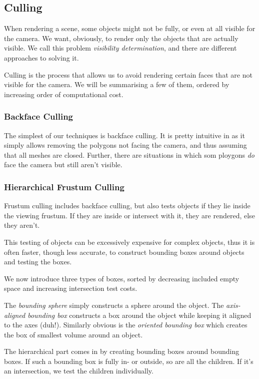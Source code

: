 \documentclass{panikzettel}
\begin{document}
\subsection{Culling}

When rendering a scene, some objects might not be fully, or even at all visible for the camera. We want, obviously, to render only the objects that are actually visible. We call this problem \emph{visibility determination}, and there are different approaches to solving it.

Culling is the process that allows us to avoid rendering certain faces that are not visible for the camera. We will be summarising a few of them, ordered by increasing order of computational cost.

\subsubsection*{Backface Culling}

The simplest of our techniques is backface culling. It is pretty intuitive in as it simply allows removing the polygons not facing the camera, and thus assuming that all meshes are closed. Further, there are situations in which som ploygons \emph{do} face the camera but still aren't visible.

\subsubsection*{Hierarchical Frustum Culling}

Frustum culling includes backface culling, but also tests objects if they lie inside the viewing frustum. If they are inside or intersect with it, they are rendered, else they aren't.

This testing of objects can be excessively expensive for complex objects, thus it is often faster, though less accurate, to construct bounding boxes around objects and testing the boxes.

We now introduce three types of boxes, sorted by decreasing included empty space and increasing intersection test costs.

The \emph{bounding sphere} simply constructs a sphere around the object. The \emph{axis-aligned bounding box} constructs a box around the object while keeping it aligned to the axes (duh!). Similarly obvious is the \emph{oriented bounding box} which creates the box of smallest volume around an object.

The hierarchical part comes in by creating bounding boxes around bounding boxes. If such a bounding box is fully in- or outside, so are all the children. If it's an intersection, we test the children individually.
\end{document}

